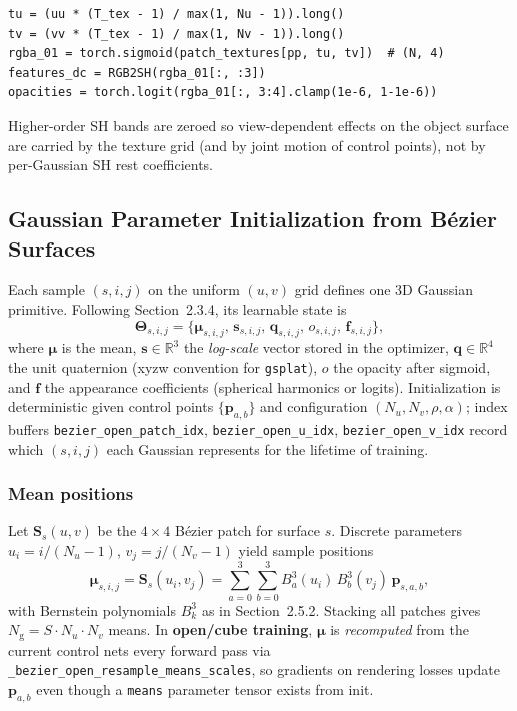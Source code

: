 \begin{lstlisting}[caption={Texture lookup in \texttt{get\_outputs} (open/cube mode).},label={lst:texture_override}]
tu = (uu * (T_tex - 1) / max(1, Nu - 1)).long()
tv = (vv * (T_tex - 1) / max(1, Nv - 1)).long()
rgba_01 = torch.sigmoid(patch_textures[pp, tu, tv])  # (N, 4)
features_dc = RGB2SH(rgba_01[:, :3])
opacities = torch.logit(rgba_01[:, 3:4].clamp(1e-6, 1-1e-6))
\end{lstlisting}

Higher-order SH bands are zeroed so view-dependent effects on the object surface are carried by the texture grid (and by joint motion of control points), not by per-Gaussian SH rest coefficients.

\subsection{Gaussian Parameter Initialization from B\'ezier Surfaces}
\label{subsec:gaussian_init}

Each sample $(s,i,j)$ on the uniform $(u,v)$ grid defines one 3D Gaussian primitive. Following Section~2.3.4, its learnable state is
\[
\boldsymbol{\Theta}_{s,i,j}=
\bigl\{
\boldsymbol{\mu}_{s,i,j},\,
\mathbf{s}_{s,i,j},\,
\mathbf{q}_{s,i,j},\,
o_{s,i,j},\,
\mathbf{f}_{s,i,j}
\bigr\},
\]
where $\boldsymbol{\mu}$ is the mean, $\mathbf{s}\in\mathbb{R}^3$ the \emph{log-scale} vector stored in the optimizer, $\mathbf{q}\in\mathbb{R}^4$ the unit quaternion (xyzw convention for \texttt{gsplat}), $o$ the opacity after sigmoid, and $\mathbf{f}$ the appearance coefficients (spherical harmonics or logits). Initialization is deterministic given control points $\{\mathbf{p}_{a,b}\}$ and configuration $(N_u,N_v,\rho,\alpha)$; index buffers \texttt{bezier\_open\_patch\_idx}, \texttt{bezier\_open\_u\_idx}, \texttt{bezier\_open\_v\_idx} record which $(s,i,j)$ each Gaussian represents for the lifetime of training.

\subsubsection{Mean positions}
\label{subsubsec:init_means}

Let $\mathbf{S}_s(u,v)$ be the $4\times 4$ B\'ezier patch for surface $s$. Discrete parameters $u_i=i/(N_u-1)$, $v_j=j/(N_v-1)$ yield sample positions
\begin{equation}
\boldsymbol{\mu}_{s,i,j}=\mathbf{S}_s(u_i,v_j)
=\sum_{a=0}^{3}\sum_{b=0}^{3} B_a^{3}(u_i)\,B_b^{3}(v_j)\,\mathbf{p}_{s,a,b},
\label{eq:gaussian_mean_bezier}
\end{equation}
with Bernstein polynomials $B_k^{3}$ as in Section~2.5.2. Stacking all patches gives $N_{\mathrm{g}}=S\cdot N_u\cdot N_v$ means. In \textbf{open/cube training}, $\boldsymbol{\mu}$ is \emph{recomputed} from the current control nets every forward pass via \texttt{\_bezier\_open\_resample\_means\_scales}, so gradients on rendering losses update $\mathbf{p}_{a,b}$ even though a \texttt{means} parameter tensor exists from init.

